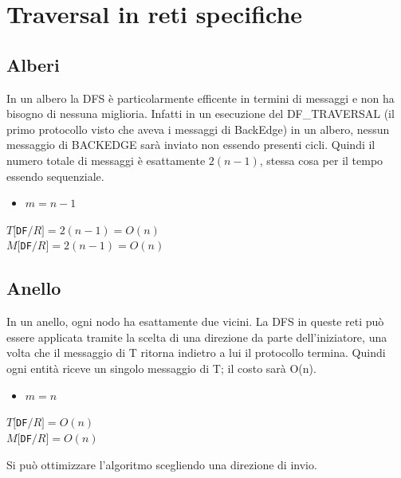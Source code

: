 \section{Traversal in reti specifiche}
\subsection{Alberi}
In un albero la DFS è particolarmente efficente in termini di messaggi e non ha bisogno di nessuna miglioria. Infatti in un esecuzione del DF\_TRAVERSAL (il primo protocollo visto che aveva i messaggi di BackEdge) in un albero, nessun messaggio di BACKEDGE sarà inviato non essendo presenti cicli. Quindi il numero totale di messaggi è esattamente $2(n-1)$, stessa cosa per il tempo essendo sequenziale.
\begin{itemize}
  \item $m = n -1$
\end{itemize}
\begin{center}
  $T[$\texttt{DF}$/R] = 2(n-1) = O(n)$\\
  $M[$\texttt{DF}$/R] = 2(n-1) = O(n)$
\end{center}
\subsection{Anello}
In un anello, ogni nodo ha esattamente due vicini. La DFS in queste reti può essere applicata tramite la scelta di una direzione da parte dell'iniziatore, una volta che il messaggio di T ritorna indietro a lui il protocollo termina. Quindi ogni entità riceve un singolo messaggio di T; il costo sarà O(n).
\begin{itemize}
  \item $m = n$
\end{itemize}
\begin{center}
  $T[$\texttt{DF}$/R] = O(n)$
\\
  $M[$\texttt{DF}$/R] = O(n)$
\end{center}
Si può ottimizzare l'algoritmo scegliendo una direzione di invio.

